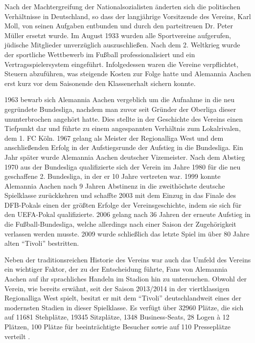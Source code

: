 Nach der Machtergreifung der Nationalsozialisten änderten sich die politischen Verhältnisse in Deutschland, so dass der langjährige Vorsitzende des Vereins, Karl Moll, von seinen Aufgaben entbunden und durch den parteitreuen Dr. Peter Müller ersetzt wurde.
Im August 1933 wurden alle Sportvereine aufgerufen, jüdische Mitglieder unverzüglich auszuschließen.
Nach dem 2. Weltkrieg wurde der sportliche Wettbewerb im Fußball professionalisiert und ein Vertragsspielersystem eingeführt.
Infolgedessen waren die Vereine verpflichtet, Steuern abzuführen, was steigende Kosten zur Folge hatte und Alemannia Aachen erst kurz vor dem Saisonende den Klassenerhalt sichern konnte.

1963 bewarb sich Alemannia Aachen vergeblich um die Aufnahme in die neu gegründete Bundesliga, nachdem man zuvor seit Gründer der Oberliga dieser ununterbrochen angehört hatte.
Dies stellte in der Geschichte des Vereins einen Tiefpunkt dar und führte zu einem angespannten Verhältnis zum Lokalrivalen, dem 1. FC Köln.
1967 gelang als Meister der Regionalliga West und dem anschließenden Erfolg in der Aufstiegsrunde der Aufstieg in die Bundesliga.
Ein Jahr später wurde Alemannia Aachen deutscher Vizemeister.
Nach dem Abstieg 1970 aus der Bundesliga qualifizierte sich der Verein im Jahre 1980 für die neu geschaffene 2. Bundesliga, in der er 10 Jahre vertreten war.
1999 konnte Alemannia Aachen nach 9 Jahren Abstinenz in die zweithöchste deutsche Spielklasse zurückkehren und schaffte 2003 mit dem Einzug in das Finale des DFB-Pokals einen der größten Erfolge der Vereinsgeschichte, indem sie sich für den UEFA-Pokal qualifizierte.
2006 gelang nach 36 Jahren der erneute Aufstieg in die Fußball-Bundesliga, welche allerdings nach einer Saison der Zugehörigkeit verlassen werden musste.
2009 wurde schließlich das letzte Spiel im über 80 Jahre alten "`Tivoli"' bestritten.

Neben der traditionsreichen Historie des Vereins war auch das Umfeld des Vereins ein wichtiger Faktor, der zu der Entscheidung führte, Fans von Alemannia Aachen auf ihr sprachliches Handeln im Stadion hin zu untersuchen.
Obwohl der Verein, wie bereits erwähnt, seit der Saison 2013/2014 in der viertklassigen Regionalliga West spielt, besitzt er mit dem "`Tivoli"' deutschlandweit eines der modernsten Stadien in dieser Spielklasse.
Es verfügt über 32960 Plätze, die sich auf 11681 Stehplätze, 19345 Sitzplätze, 1348 Business-Seats, 28 Logen à 12 Plätzen, 100 Plätze für beeinträchtigte Besucher sowie auf 110 Presseplätze verteilt \cite{AA15}.

